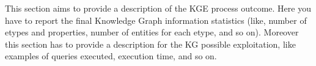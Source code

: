 
This section aims to provide a description of the KGE process outcome. Here you have to report the final Knowledge Graph information statistics (like, number of etypes and properties, number of entities for each etype, and so on). Moreover this section has to provide a description for the KG possible exploitation, like examples of queries executed, execution time, and so on.

